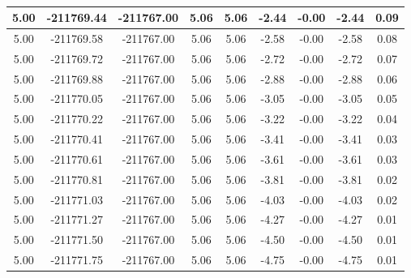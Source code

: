 \begin{table}[htbp]
\begin{adjustbox}{angle=90}
\begin{tabular}{|c|c|c|c|c|c|c|c|c|}
 5.00 & -211769.44 & -211767.00 & 5.06 & 5.06 & -2.44 & -0.00 & -2.44 & 0.09\\ \hline
 5.00 & -211769.58 & -211767.00 & 5.06 & 5.06 & -2.58 & -0.00 & -2.58 & 0.08\\ \hline
 5.00 & -211769.72 & -211767.00 & 5.06 & 5.06 & -2.72 & -0.00 & -2.72 & 0.07\\ \hline
 5.00 & -211769.88 & -211767.00 & 5.06 & 5.06 & -2.88 & -0.00 & -2.88 & 0.06\\ \hline
 5.00 & -211770.05 & -211767.00 & 5.06 & 5.06 & -3.05 & -0.00 & -3.05 & 0.05\\ \hline
 5.00 & -211770.22 & -211767.00 & 5.06 & 5.06 & -3.22 & -0.00 & -3.22 & 0.04\\ \hline
 5.00 & -211770.41 & -211767.00 & 5.06 & 5.06 & -3.41 & -0.00 & -3.41 & 0.03\\ \hline
 5.00 & -211770.61 & -211767.00 & 5.06 & 5.06 & -3.61 & -0.00 & -3.61 & 0.03\\ \hline
 5.00 & -211770.81 & -211767.00 & 5.06 & 5.06 & -3.81 & -0.00 & -3.81 & 0.02\\ \hline
 5.00 & -211771.03 & -211767.00 & 5.06 & 5.06 & -4.03 & -0.00 & -4.03 & 0.02\\ \hline
 5.00 & -211771.27 & -211767.00 & 5.06 & 5.06 & -4.27 & -0.00 & -4.27 & 0.01\\ \hline
 5.00 & -211771.50 & -211767.00 & 5.06 & 5.06 & -4.50 & -0.00 & -4.50 & 0.01\\ \hline
 5.00 & -211771.75 & -211767.00 & 5.06 & 5.06 & -4.75 & -0.00 & -4.75 & 0.01\\ \hline
            \end{tabular}
        \end{adjustbox}
        \caption{}
        \label{}
    \end{table}
    